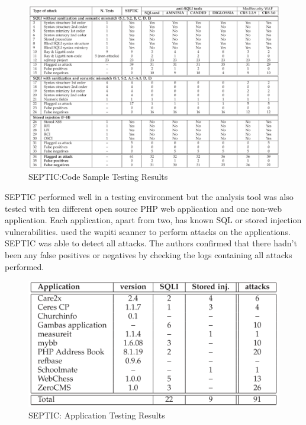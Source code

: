 \begin{figure}
\centering
\includegraphics[scale=0.65]{septic_results.PNG}
\caption{SEPTIC:Code Sample Testing Results \autocite[1182]{Medeiros2019}}
\label{septic1}
\end{figure}

SEPTIC performed well in a testing environment but the analysis tool was also tested with ten different open source PHP web application and one non-web application. Each application, apart from two, has known SQL or stored injection vulnerabilities. \textcite[]{Medeiros2019} used the wapiti scanner \autocite[]{Surribas2016} to perform attacks on the applications. SEPTIC was able to detect all attacks. The authors confirmed that there hadn't been any false positives or negatives by checking the logs containing all attacks performed.

\begin{figure}[H]
\centering
\includegraphics[scale=0.75]{septic_application_test.PNG}
\caption{SEPTIC: Application Testing Results \autocite[1183]{Medeiros2019}}
\end{figure}

